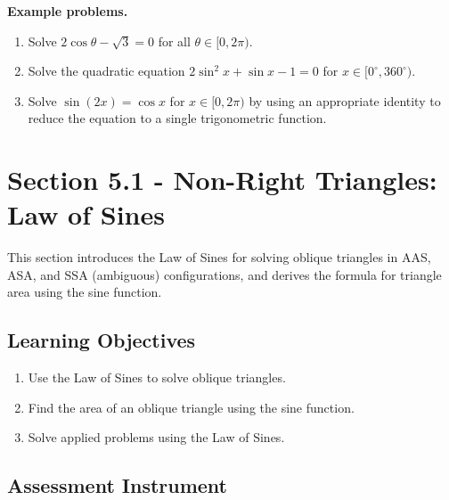 \textbf{Example problems.}
\begin{enumerate}
    \item Solve $2\cos\theta - \sqrt{3} = 0$ for all $\theta \in [0, 2\pi)$.
    \item Solve the quadratic equation $2\sin^{2}x + \sin x - 1 = 0$ for $x \in [0^{\circ}, 360^{\circ})$.
    \item Solve $\sin(2x) = \cos x$ for $x \in [0, 2\pi)$ by using an appropriate identity to reduce the equation to a single trigonometric function.
\end{enumerate}

\section{Section 5.1 - Non-Right Triangles: Law of Sines}
\label{sec:sect-afc1}

This section introduces the Law of Sines for solving oblique triangles in AAS, ASA, and
SSA (ambiguous) configurations, and derives the formula for triangle area using the sine
function.

\subsection{Learning Objectives}
\label{ssec:lear-fe6e}

\begin{enumerate}
    \item Use the Law of Sines to solve oblique triangles.
    \item Find the area of an oblique triangle using the sine function.
    \item Solve applied problems using the Law of Sines.
\end{enumerate}

\subsection{Assessment Instrument}
\label{ssec:asse-3669}

